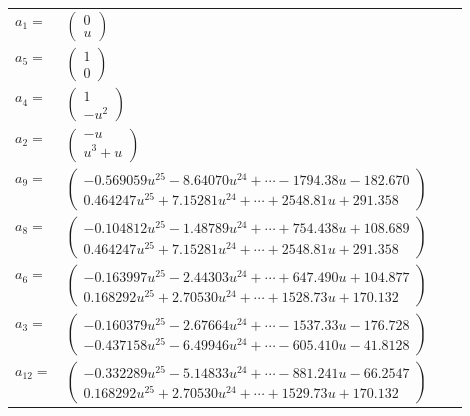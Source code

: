 \documentclass[1p]{elsarticle_modified}
\theoremstyle{definition}
\begin{document}
\begin{tabular}{m{7pt} m{180pt} m{7pt} m{180pt} }
\flushright $a_{1}=$&$\begin{pmatrix}0\\u\end{pmatrix}$ \\
\flushright $a_{5}=$&$\begin{pmatrix}1\\0\end{pmatrix}$ \\
\flushright $a_{4}=$&$\begin{pmatrix}1\\- u^2\end{pmatrix}$ \\
\flushright $a_{2}=$&$\begin{pmatrix}- u\\u^3+u\end{pmatrix}$ \\
\flushright $a_{9}=$&$\begin{pmatrix}-0.569059 u^{25}-8.64070 u^{24}+\cdots-1794.38 u-182.670\\0.464247 u^{25}+7.15281 u^{24}+\cdots+2548.81 u+291.358\end{pmatrix}$ \\
\flushright $a_{8}=$&$\begin{pmatrix}-0.104812 u^{25}-1.48789 u^{24}+\cdots+754.438 u+108.689\\0.464247 u^{25}+7.15281 u^{24}+\cdots+2548.81 u+291.358\end{pmatrix}$ \\
\flushright $a_{6}=$&$\begin{pmatrix}-0.163997 u^{25}-2.44303 u^{24}+\cdots+647.490 u+104.877\\0.168292 u^{25}+2.70530 u^{24}+\cdots+1528.73 u+170.132\end{pmatrix}$ \\
\flushright $a_{3}=$&$\begin{pmatrix}-0.160379 u^{25}-2.67664 u^{24}+\cdots-1537.33 u-176.728\\-0.437158 u^{25}-6.49946 u^{24}+\cdots-605.410 u-41.8128\end{pmatrix}$ \\
\flushright $a_{12}=$&$\begin{pmatrix}-0.332289 u^{25}-5.14833 u^{24}+\cdots-881.241 u-66.2547\\0.168292 u^{25}+2.70530 u^{24}+\cdots+1529.73 u+170.132\end{pmatrix}$ \\

\end{tabular}
\end{document}

